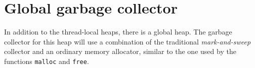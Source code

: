\section{Global garbage collector}

In addition to the thread-local heaps, there is a global heap.  The
garbage collector for this heap will use a combination of the
traditional \emph{mark-and-sweep} collector and an ordinary memory
allocator, similar to the one used by the \clanguage{} functions
\texttt{malloc} and \texttt{free}.
